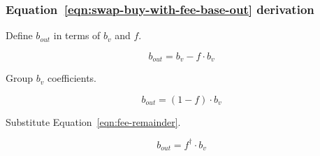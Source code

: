 \subsubsection{Equation~\ref{eqn:swap-buy-with-fee-base-out} derivation}%
\label{sssec:equation-eqn-swap-buy-with-fee-base-out-derivation}

Define $b_{out}$ in terms of $b_v$ and $f$.

\begin{equation*}
	b_{out} = b_v - f \cdot b_v
\end{equation*}

Group $b_v$ coefficients.

\begin{equation*}
	b_{out} = (1 - f) \cdot b_v
\end{equation*}

Substitute Equation~\ref{eqn:fee-remainder}.

\begin{equation*}
	b_{out} = f^{\dagger} \cdot b_v
\end{equation*}
